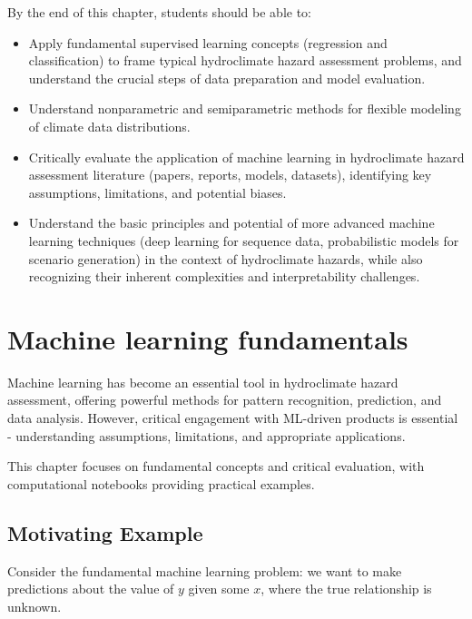 \documentclass[
  letterpaper,
  DIV=11,
  numbers=noendperiod]{scrreprt}
\providecommand{\tightlist}{%
  \setlength{\itemsep}{0pt}\setlength{\parskip}{0pt}}
\begin{document}

By the end of this chapter, students should be able to:

\begin{itemize}
\tightlist
\item
  Apply fundamental supervised learning concepts (regression and
  classification) to frame typical hydroclimate hazard assessment
  problems, and understand the crucial steps of data preparation and
  model evaluation.
\item
  Understand nonparametric and semiparametric methods for flexible
  modeling of climate data distributions.
\item
  Critically evaluate the application of machine learning in
  hydroclimate hazard assessment literature (papers, reports, models,
  datasets), identifying key assumptions, limitations, and potential
  biases.
\item
  Understand the basic principles and potential of more advanced machine
  learning techniques (deep learning for sequence data, probabilistic
  models for scenario generation) in the context of hydroclimate
  hazards, while also recognizing their inherent complexities and
  interpretability challenges.
\end{itemize}

\section{Machine learning
fundamentals}\label{machine-learning-fundamentals}

Machine learning has become an essential tool in hydroclimate hazard
assessment, offering powerful methods for pattern recognition,
prediction, and data analysis. However, critical engagement with
ML-driven products is essential - understanding assumptions,
limitations, and appropriate applications.

This chapter focuses on fundamental concepts and critical evaluation,
with computational notebooks providing practical examples.

\subsection{Motivating Example}\label{motivating-example}

Consider the fundamental machine learning problem: we want to make
predictions about the value of \(y\) given some \(x\), where the true
relationship is unknown.
\end{document}

